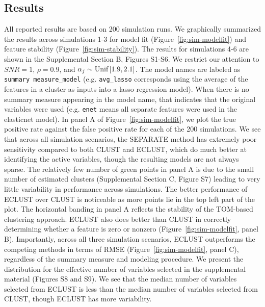 \subsection{Results}
All reported results are based on 200 simulation runs. We graphically summarized the results across simulations 1-3 for model fit (Figure~\ref{fig:sim-modelfit}) and feature stability (Figure~\ref{fig:sim-stability}). The results for simulations 4-6 are shown in the Supplemental Section B, Figures S1-S6. We restrict our attention to $SNR=1$, $\rho = 0.9$, and $\alpha_{j} \sim \textrm{{Unif}}\left[1.9, 2.1\right]$. The model names are labeled as \texttt{summary measure\_model} (e.g. \texttt{avg\_lasso} corresponds using the average of the features in a cluster as inputs into a lasso regression model). When there is no summary measure appearing in the model name, that indicates that the original variables were used (e.g. \texttt{enet} means all separate features were used in the elasticnet model). In panel A of Figure~\ref{fig:sim-modelfit}, we plot the true positive rate against the false positive rate for each of the 200 simulations. We see that across all simulation scenarios, the SEPARATE method has extremely poor sensitivity compared to both CLUST and ECLUST, which do much better at identifying the active variables, though the resulting models are not always sparse. The relatively few number of green points in panel A is due to the small number of estimated clusters (Supplemental Section C, Figure S7) leading to very little variability in performance across simulations. The better performance of ECLUST over CLUST is noticeable as more points lie in the top left part of the plot. The horizontal banding in panel A reflects the stability of the TOM-based clustering approach.
ECLUST also does better than CLUST in correctly determining whether a feature is zero or nonzero (Figure~\ref{fig:sim-modelfit}, panel B). Importantly, across all three simulation scenarios, ECLUST outperforms the competing methods in terms of RMSE (Figure~\ref{fig:sim-modelfit}, panel C), regardless of the summary measure and modeling procedure. We present the distribution for the effective number of variables selected in the supplemental material (Figures S8 and S9). We see that the median number of variables selected from ECLUST is less than the median number of variables selected from CLUST, though ECLUST has more variability.

\begin{comment}
\begin{figure}[H]
	\centering
	\texttt{[image: figure5.eps]}
	\caption{Model fit results from simulations 1, 2 and 3 with $SNR=1$, $\rho = 0.9$, and $\alpha_{j} \sim \tm{Unif}\left[1.9, 2.1\right]$. SEPARATE results are in pink, CLUST in green and ECLUST in blue.}
	\label{fig:sim-modelfit}
\end{figure}
\end{comment}


